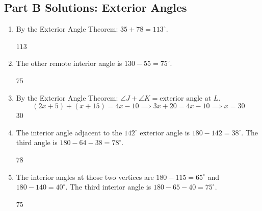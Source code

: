\documentclass[14pt]{extarticle}
\begin{document}
\subsection*{Part B Solutions: Exterior Angles}
\begin{enumerate}
  \item By the Exterior Angle Theorem: \(35 + 78 = 113^\circ\).

  \(\boxed{113}\)

  \item The other remote interior angle is \(130 - 55 = 75^\circ\).

  \(\boxed{75}\)

  \item By the Exterior Angle Theorem: \(\angle J + \angle K = \text{exterior angle at } L\).
  \[
  (2x + 5) + (x + 15) = 4x - 10 \implies 3x + 20 = 4x - 10 \implies x = 30
  \]
  \(\boxed{30}\)

  \item The interior angle adjacent to the \(142^\circ\) exterior angle is \(180 - 142 = 38^\circ\). The third angle is \(180 - 64 - 38 = 78^\circ\).

  \(\boxed{78}\)

  \item The interior angles at those two vertices are \(180 - 115 = 65^\circ\) and \(180 - 140 = 40^\circ\). The third interior angle is \(180 - 65 - 40 = 75^\circ\).

  \(\boxed{75}\)
\end{enumerate}
\end{document}
